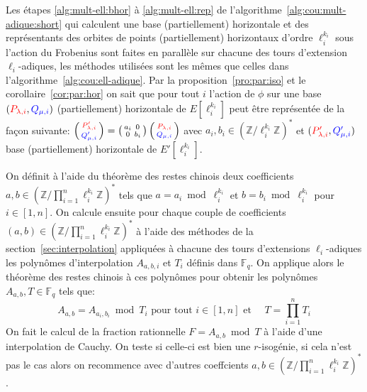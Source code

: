 \documentclass[10pt,a4paper]{book}
\theoremstyle{plain}
\theoremstyle{definition}
\theoremstyle{definition}
\theoremstyle{definition}
\theoremstyle{definition}
\theoremstyle{remark}
\theoremstyle{remark}
\theoremstyle{definition}
\begin{document}
Les étapes \ref{alg:mult-ell:bhor} à \ref{alg:mult-ell:rep} de 
l'algorithme~\ref{alg:cou:mult-adique:short} qui calculent une base (partiellement) 
horizontale et des représentants des orbites de points (partiellement) 
horizontaux d'ordre $\ell_i^{k_i}$ sous l'action du Frobenius sont faites en 
parallèle sur chacune des tours d'extension $\ell_i$-adiques, les méthodes 
utilisées sont les mêmes que celles dans l'algorithme~\ref{alg:cou:ell-adique}.
Par la proposition~\ref{pro:par:iso} et le corollaire~\ref{cor:par:hor} on sait
 que pour tout $i$ l'action de $\phi$ sur une base
$(\color{red}P_{\lambda,i}\color{black},\color{blue}Q_{\mu,i}\color{black})$
 (partiellement) horizontale de $E[\ell_i^{k_i}]$ peut être représentée de la façon suivante:
$
\left(\begin{smallmatrix}
\color{red} P'_{\lambda,i} \\
\color{blue} Q'_{\mu,i} \color{black}
\end{smallmatrix} \right)= \left(\begin{smallmatrix}
a_i & 0 \\
0 & b_i\end{smallmatrix} \right)
\left(\begin{smallmatrix}
\color{red} P_{\lambda,i} \\
\color{blue} Q_{\mu,i} \color{black} \end{smallmatrix} \right)$
avec $ a_i,b_i \in \left( \mathbb{Z}/\ell_i^{k_i}\mathbb{Z} \right)^*$ et 
$(\color{red}P'_{\lambda,i}\color{black},\color{blue}Q'_{\mu,i}\color{black})$
base (partiellement) horizontale de $E'[\ell_i^{k_i}]$.

On définit à l'aide du théorème des restes chinois deux coefficients $a,b \in 
\left( \mathbb{Z}/\prod_{i=1}^n\ell_i^{k_i} \mathbb{Z} \right)^*$ tels que 
$a=a_i \bmod \ell_i^{k_i}$ et $b=b_i \bmod \ell_i^{k_i}$ pour $i\in [1,n]$.
On calcule ensuite pour chaque couple de coefficients 
$(a,b) \in (\mathbb{Z}/\prod_{i=1}^n\ell_i^{k_i}\mathbb{Z})^*$ à l'aide des 
méthodes de la section~\ref{sec:interpolation} appliquées
à chacune des tours d'extensions $\ell_i$-adiques les polynômes 
d'interpolation $A_{a,b,i}$ et $T_i$ définis dans $\mathbb{F}_q$.
 On applique alors le théorème des restes chinois à ces polynômes pour obtenir 
 les polynômes $A_{a,b},T \in \mathbb{F}_q$ tels que:
 \[
A_{a,b}=A_{a_i,b_i} \bmod T_i \text{ pour tout } i \in [1,n] \text{ et } \quad T=\prod_{i=1}^nT_i 
 \]
On fait le calcul de la fraction rationnelle $F=A_{a,b} \bmod T$ à l'aide d'une
interpolation de Cauchy. On teste si celle-ci est bien une $r$-isogénie,
si cela n'est pas le cas alors on recommence avec d'autres coeffcients $a,b \in 
(\mathbb{Z}/\prod_{i=1}^n\ell_i^{k_i} \mathbb{Z})^*$.
\end{document}
